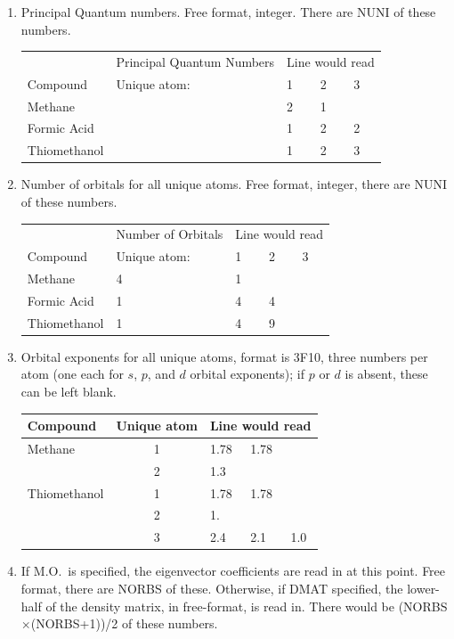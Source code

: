 \begin{enumerate}
\item Principal Quantum numbers. Free format, integer. There are
NUNI of these numbers.

\begin{tabular}{ll|lll}
\hline
  & Principal Quantum Numbers  & \multicolumn{3}{c}{Line would read}  \\
     Compound &  Unique atom: & 1 & 2 & 3
\\ \hline
     Methane  &               & 2 & 1 &    \\
     Formic Acid  &           & 1 & 2 & 2    \\
     Thiomethanol &           & 1 & 2 & 3    \\
\end{tabular}

\item Number of orbitals for all unique atoms. Free format, integer, there are
NUNI of these numbers.

\begin{tabular}{ll|lll}
\hline
&            Number of Orbitals  & \multicolumn{3}{c}{Line would read} \\
     Compound &  Unique atom: & 1 & 2 & 3  \\
               \hline
     Methane  &                4 & 1  \\
     Formic Acid  &            1 & 4 & 4  \\
     Thiomethanol &            1 & 4 & 9  \\
\hline
\end{tabular}

\item Orbital exponents for all unique atoms, format is 3F10, three numbers
per atom (one each for $s$, $p$, and $d$ orbital exponents); if $p$ or $d$ is
absent, these can be left blank.

\begin{tabular}{lc|lll} \hline
 Compound & Unique atom &  \multicolumn{3}{c}{Line would read} \\ \hline
     Methane       &      1      & 1.78  &    1.78  \\
                   &      2      & 1.3&  \\
     Thiomethanol  &      1      & 1.78  &    1.78  \\
                   &      2      & 1.&  \\
                   &      3      & 2.4   &    2.1   &    1.0  \\ \hline
\end{tabular}

\item If M.O.\  is specified, the eigenvector coefficients are read in
at this point. Free format, there
are NORBS of these. Otherwise, if DMAT specified, the lower-half
of the density matrix, in free-format, is read in. There would be
(NORBS$\times$(NORBS+1))/2 of these numbers.
\end{enumerate}

